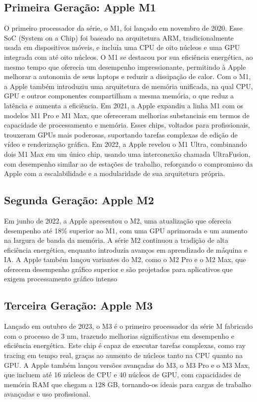\documentclass[a4paper,times,12pt]{article}
\begin{document}
\subsection{Primeira Geração: Apple M1}
\hspace{+15pt} 
O primeiro processador da série, o M1, foi lançado em novembro de 2020. Esse SoC (System on a Chip) foi baseado na arquitetura ARM, tradicionalmente usada em dispositivos móveis, e incluía uma CPU de oito núcleos e uma GPU integrada com até oito núcleos. O M1 se destacou por sua eficiência energética, ao mesmo tempo que oferecia um desempenho impressionante, permitindo à Apple melhorar a autonomia de seus laptops e reduzir a dissipação de calor. Com o M1, a Apple também introduziu uma arquitetura de memória unificada, na qual CPU, GPU e outros componentes compartilham a mesma memória, o que reduz a latência e aumenta a eficiência.
Em 2021, a Apple expandiu a linha M1 com os modelos M1 Pro e M1 Max, que ofereceram melhorias substanciais em termos de capacidade de processamento e memória. Esses chips, voltados para profissionais, trouxeram GPUs mais poderosas, suportando tarefas complexas de edição de vídeo e renderização gráfica. Em 2022, a Apple revelou o M1 Ultra, combinando dois M1 Max em um único chip, usando uma interconexão chamada UltraFusion, com desempenho similar ao de estações de trabalho, reforçando o compromisso da Apple com a escalabilidade e a modularidade de sua arquitetura própria.

\subsection{Segunda Geração: Apple M2}
\hspace{+15pt} 
Em junho de 2022, a Apple apresentou o M2, uma atualização que oferecia desempenho até 18\% superior ao M1, com uma GPU aprimorada e um aumento na largura de banda da memória. A série M2 continuou a tradição de alta eficiência energética, enquanto introduzia avanços em aprendizado de máquina e IA. A Apple também lançou variantes do M2, como o M2 Pro e o M2 Max, que oferecem desempenho gráfico superior e são projetados para aplicativos que exigem processamento gráfico intenso
\subsection{Terceira Geração: Apple M3}
\hspace{+15pt}
Lançado em outubro de 2023, o M3 é o primeiro processador da série M fabricado com o processo de 3 nm, trazendo melhorias significativas em desempenho e eficiência energética. Este chip é capaz de executar tarefas complexas, como ray tracing em tempo real, graças ao aumento de núcleos tanto na CPU quanto na GPU. A Apple também lançou versões avançadas do M3, o M3 Pro e o M3 Max, que incluem até 16 núcleos de CPU e 40 núcleos de GPU, com capacidades de memória RAM que chegam a 128 GB, tornando-os ideais para cargas de trabalho avançadas e uso profissional.
\end{document}
